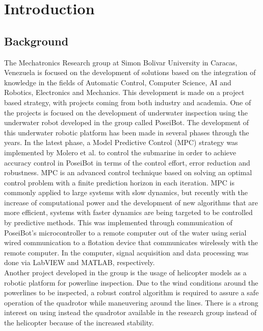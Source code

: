 \chapter{Introduction}
\label{chap:Introduction}
%
%
%
%

\section{Background}

The Mechatronics Research group at Simon Bolivar University in Caracas, Venezuela is focused on the development of solutions based on the integration of knowledge in the fields of Automatic Control, Computer Science, AI and Robotics, Electronics and Mechanics. This development is made on a project based strategy, with projects coming from both industry and academia. One of the projects is focused on the development of underwater inspection using the underwater robot developed in the group called PoseiBot. The development of this underwater robotic platform has been made in several phases through the years. In the latest phase, a Model Predictive Control (MPC) strategy was implemented by Molero et al. \cite{Molero2011} to control the submarine in order to achieve accuracy control in PoseiBot in terms of the control effort, error reduction and robustness. MPC is an advanced control technique based on solving an optimal control problem with a finite prediction horizon in each iteration. MPC is commonly applied to large systems with slow dynamics, but recently with the increase of computational power and the development of new algorithms that are more efficient, systems with faster dynamics are being targeted to be controlled by predictive methods. This was implemented through communication of PoseiBot's microcontroller to a remote computer out of the water using serial wired communication to a flotation device that communicates wirelessly with the remote computer. In the computer, signal acquisition  and data processing was done via LabVIEW \texttrademark  and MATLAB\textsuperscript{\textregistered}, respectively. \\

Another project developed in the group is the usage of helicopter models as a robotic platform for powerline inspection. Due to the wind conditions around the powerlines to be inspected, a robust control algorithm is required to assure a safe operation of the quadrotor while maneuvering around the lines. There is a strong interest on using instead the quadrotor available in the research group instead of the helicopter because of the increased stability. \\

